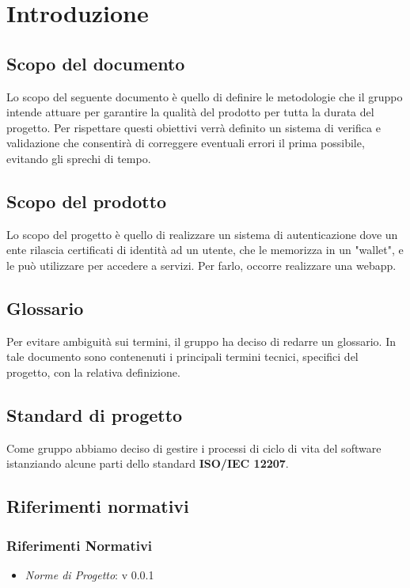 \section{Introduzione}
\subsection{Scopo del documento}
Lo scopo del seguente documento è quello di definire le metodologie che il gruppo intende attuare per garantire la qualità del prodotto per tutta la durata del progetto.
Per rispettare questi obiettivi verrà definito un sistema di verifica e validazione che consentirà di correggere eventuali errori il prima possibile, evitando gli sprechi di tempo.
\subsection{Scopo del prodotto} %
Lo scopo del progetto è quello di realizzare un sistema di autenticazione dove un ente rilascia
certificati di identità ad un utente, che le memorizza in un "wallet", e le può utilizzare
per accedere a servizi. Per farlo, occorre realizzare una webapp.
\subsection{Glossario}
Per evitare ambiguità sui termini, il gruppo ha deciso di redarre un glossario. In tale documento sono contenenuti i principali termini tecnici, specifici del progetto, con la relativa definizione.
\subsection{Standard di progetto}
Come gruppo abbiamo deciso di gestire i processi di ciclo di vita del software istanziando alcune parti dello standard \textbf{ISO/IEC 12207}.
\subsection{Riferimenti normativi}%
\subsubsection{Riferimenti Normativi}
\begin{itemize}
    \item \textit{Norme di Progetto}: v 0.0.1
\end{itemize}

